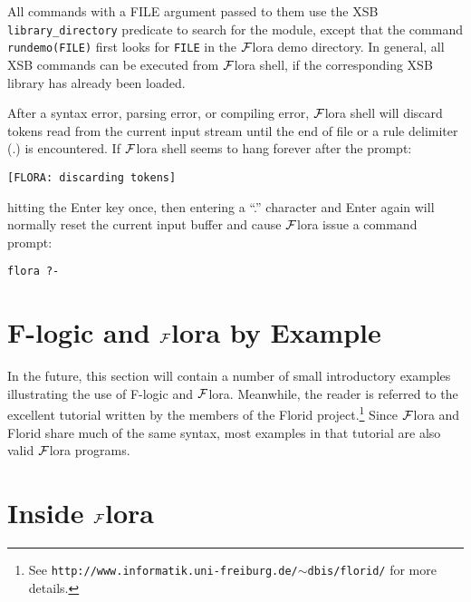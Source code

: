 \documentclass[11pt]{article}
\newcommand{\FLORA}{{\mbox{${\cal F}${\sc lora}}}\xspace}
\newcommand{\FLORID}{{\mbox{\sc Florid}}\xspace}
\newcommand{\fl}{{F-logic}\xspace}
\begin{document}
All commands with a FILE argument passed to them use the XSB {\tt
  library\_directory} predicate to search for the module, except that the
command {\tt rundemo(FILE)} first looks for {\tt FILE} in the \FLORA demo
directory. In general, all XSB commands can be executed from \FLORA shell,
if the corresponding XSB library has already been loaded.

After a syntax error, parsing error, or compiling error, \FLORA shell will
discard tokens read from the current input stream until the end of file or a
rule delimiter (.) is encountered. If \FLORA shell seems to hang forever
after the prompt:
\begin{verbatim}
[FLORA: discarding tokens]
\end{verbatim}
hitting the Enter key once, then entering a ``.'' character and Enter again
will normally reset the current input buffer and cause \FLORA issue a
command prompt:
\begin{verbatim}
flora ?-
\end{verbatim}

 
\section{\fl and \FLORA by Example}

In the future, this section will contain a number of small
introductory examples illustrating the use of F-logic and \FLORA. Meanwhile, the
reader is referred to the excellent tutorial written by the members of the
\FLORID project.\footnote{
  See {\tt http://www.informatik.uni-freiburg.de/$\sim$dbis/florid/} for more
  details.
  }
Since \FLORA and \FLORID share much of the same syntax, most examples in that
tutorial are also valid \FLORA programs.



\section{Inside \FLORA}
\end{document}
